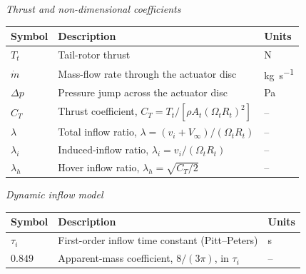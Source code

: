 \documentclass[11pt,a4paper]{article}
\newcommand{\OmegaT}{\Omega_t}
\newcommand{\Rt}{R_t}
\newcommand{\At}{A_t}
\newcommand{\Tt}{T_t}
\newcommand{\vi}{v_i}
\begin{document}
\vspace{0.5em}
\noindent\textit{Thrust and non-dimensional coefficients}
\begin{center}
\renewcommand{\arraystretch}{1.12}
\begin{tabular}{@{}l l l@{}}
\toprule
Symbol & Description & Units \\
\midrule
\(\Tt\)         & Tail-rotor thrust                                   & \si{\newton}\\
\(\dot{m}\)     & Mass-flow rate through the actuator disc            & \si{\kilogram\per\second}\\
\(\Delta p\)    & Pressure jump across the actuator disc              & \si{\pascal}\\
\(C_T\)         & Thrust coefficient, \(C_T = \Tt/[\rho\At(\OmegaT\Rt)^2]\) & --\\
\(\lambda\)     & Total inflow ratio, \(\lambda=(\vi+V_\infty)/(\OmegaT\Rt)\) & --\\
\(\lambda_i\)   & Induced-inflow ratio, \(\lambda_i = \vi/(\OmegaT\Rt)\) & --\\
\(\lambda_h\)   & Hover inflow ratio, \(\lambda_h=\sqrt{C_T/2}\)        & --\\
\bottomrule
\end{tabular}
\end{center}

\vspace{0.5em}
\noindent\textit{Dynamic inflow model}
\begin{center}
\renewcommand{\arraystretch}{1.12}
\begin{tabular}{@{}l l l@{}}
\toprule
Symbol & Description & Units \\
\midrule
\(\tau_i\)      & First-order inflow time constant (Pitt--Peters)     & \si{\second}\\
\(0.849\)       & Apparent-mass coefficient, \(8/(3\pi)\), in \(\tau_i\) & --\\
\bottomrule
\end{tabular}
\end{center}
\end{document}
